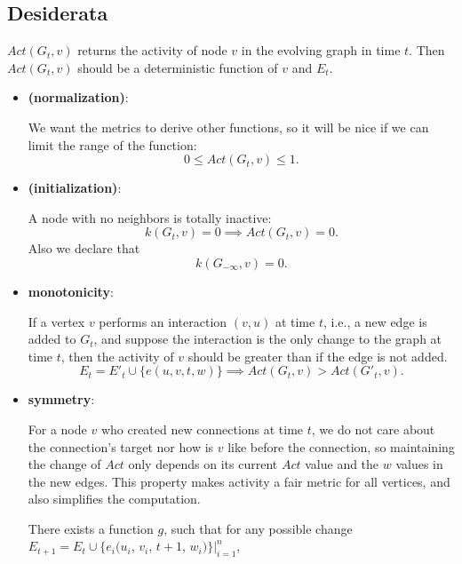\documentclass[12pt,abstract=true]{scrartcl}
\numberwithin{equation}{section}
\theoremstyle{definition}   \newtheorem{definition}{Definition}[section]
\theoremstyle{plain}        \newtheorem{theorem}{Theorem}[section]
\theoremstyle{plain}        \newtheorem{observation}{Observation}[section]
\theoremstyle{plain}        \newtheorem{fact}{Fact}[section]
\theoremstyle{plain}        \newtheorem{claim}{Claim}[section]
\theoremstyle{plain}        \newtheorem{lemma}[theorem]{Lemma}
\theoremstyle{plain}        \newtheorem{corollary}[theorem]{Corollary}
\theoremstyle{remark}       \newtheorem{example}{Example}[section]
\theoremstyle{remark}       \newtheorem{remark}{Remark}[section]
\begin{document}
\subsection{Desiderata}
 $\mathit{Act}(G_t,v)$ returns the activity of node $v$ in the evolving graph in
time $t$. Then $\mathit{Act}(G_t,v)$ should be a deterministic function of $v$ and
$E_t$.
\begin{itemize}
\item \textbf{(normalization)}:

We want the metrics to derive other functions, so it will be nice if we can
limit the range of the function:
\begin{equation}
0\leq \mathit{Act}(G_t,v) \leq 1.
\end{equation}

\item \textbf{(initialization)}:

A node with no neighbors is totally inactive:
\begin{equation}
k(G_t,v)=0\implies \mathit{Act}(G_t,v)=0.
\end{equation}
Also we declare that
\begin{equation}
k(G_{-\infty},v)=0.
\end{equation}

\item \textbf{monotonicity}:

If a vertex $v$ performs an interaction $(v,u)$ at time $t$, i.e., a new edge
is added to $G_t$, and suppose the interaction is the only change to the graph
at time $t$, then the activity of $v$ should be greater than if the edge is not
added.
\begin{equation}
E_t=E'_t\cup\{e(u,v,t,w)\}\implies \mathit{Act}(G_{t},v)>\mathit{Act}(G'_{t},v
).\label{eq-mono}
\end{equation}

\item \textbf{symmetry}:

For a node $v$ who created new connections at time $t$, we do not care about
the connection's target nor how is $v$ like before the connection, so
maintaining the change of $\mathit{Act}$ only depends on its current
$\mathit{Act}$ value and the $w$ values in the new edges. This property makes
activity a fair metric for all vertices, and also simplifies the computation.

There exists a function $g$, such that for any possible change
$E_{t+1}=E_t\cup\{e_i(u_i$, $v_i$, $t+1$, $w_i)\}|_{i=1}^n$,


\end{itemize}
\end{document}

